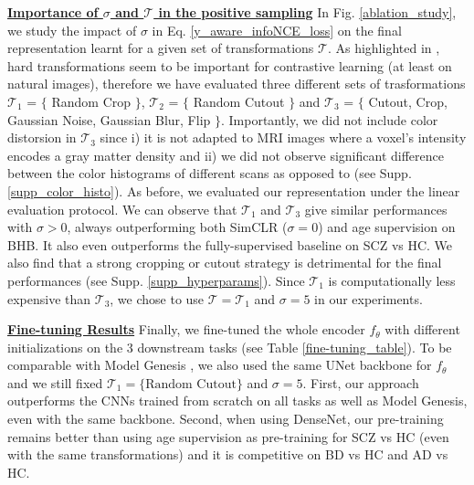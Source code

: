 \documentclass[runningheads]{llncs}
\begin{document}
\justify
\underline{\textbf{Importance of $\sigma$ and $\mathcal{T}$ in the positive sampling}}
In Fig. \ref{ablation_study}, we study the impact of $\sigma$ in Eq. \ref{y_aware_infoNCE_loss} on the final representation learnt for a given set of transformations $\mathcal{T}$. As highlighted in \cite{chen2020simCLR}, hard transformations seem to be important for contrastive learning (at least on natural images), therefore we have evaluated three different sets of trasformations $\mathcal{T}_1$ = $\{$ Random Crop $\}$, $\mathcal{T}_2$ = $\{$ Random Cutout $\}$ and $\mathcal{T}_3$ = $\{$ Cutout, Crop, Gaussian Noise, Gaussian Blur, Flip $\}$. Importantly, we did not include color distorsion in $\mathcal{T}_3$ since i) it is not adapted to MRI images where a voxel's intensity encodes a gray matter density and ii) we did not observe significant difference between the color histograms of different scans as opposed to \cite{chen2020simCLR} (see Supp. \ref{supp_color_histo}). As before, we evaluated our representation under the linear evaluation protocol. We can observe that $\mathcal{T}_1$ and $\mathcal{T}_3$ give similar performances with $\sigma > 0$, always outperforming both SimCLR ($\sigma=0$) and age supervision on BHB. It also even outperforms the fully-supervised baseline on SCZ vs HC. We also find that a strong cropping or cutout strategy is detrimental for the final performances (see Supp. \ref{supp_hyperparams}). Since $\mathcal{T}_1$ is computationally less expensive than $\mathcal{T}_3$, we chose to use $\mathcal{T}=\mathcal{T}_1$ and $\sigma=5$ in our experiments.


\justify
\underline{\textbf{Fine-tuning Results}}
Finally, we fine-tuned the whole encoder $f_\theta$ with different initializations on the 3 downstream tasks (see Table \ref{fine-tuning_table}). To be comparable with Model Genesis \cite{zhou2020genesis}, we also used the same UNet backbone for $f_\theta$ and we still fixed $\mathcal{T}_1 = \{\text{Random Cutout}\}$ and $\sigma=5$. First, our approach outperforms the CNNs trained from scratch on all tasks as well as Model Genesis, even with the same backbone. Second, when using DenseNet, our pre-training remains better than using age supervision as pre-training for SCZ vs HC (even with the same transformations) and it is competitive on  BD vs HC and AD vs HC. 
    
\end{document}
